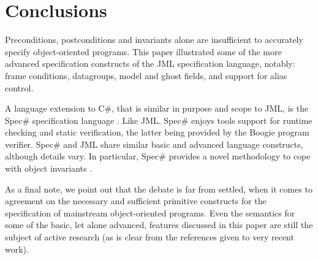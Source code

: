 \documentclass{llncs}
\begin{document}
% 
%

\section{Conclusions}
\label{Sec:conclusion}

Preconditions, postconditions and invariants alone are insufficient to
accurately specify object-oriented programs.  This paper illustrated some of
the more advanced specification constructs of the JML specification language,
notably: frame conditions, datagroups, model and
ghost fields, and support for alias control.

A language extension to C\#, that is similar in purpose and scope to JML, is
the Spec\# specification language \cite{SpecSharp}.
%
Like JML, Spec\# enjoys tools support for runtime checking and static
verification, the latter being provided by the Boogie program verifier.
%
Spec\# and JML share similar basic and advanced language constructs, 
although details vary.  In particular, Spec\# provides a novel methodology to 
cope with object invariants \cite{BoogieInvariants}.

As a final note, we point out that the debate is far from settled, when it
comes to agreement on the necessary and sufficient primitive constructs
for the specification of mainstream object-oriented programs.
%
Even the semantics for some of the basic, let alone advanced, features
discussed in this paper are still the subject of active research (as is clear
from the references given to very recent work).



\end{document}
